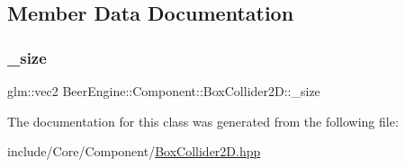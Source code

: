 \subsection{Member Data Documentation}
\mbox{\label{class_beer_engine_1_1_component_1_1_box_collider2_d_ae1472ec7f94fbd4d9cf3854d531f6988}} 
\subsubsection{\texorpdfstring{\+\_\+size}{\_size}}
{\footnotesize\ttfamily glm\+::vec2 Beer\+Engine\+::\+Component\+::\+Box\+Collider2\+D\+::\+\_\+size}



The documentation for this class was generated from the following file\+:\begin{DoxyCompactItemize}
\item 
include/\+Core/\+Component/\mbox{\hyperlink{_box_collider2_d_8hpp}{Box\+Collider2\+D.\+hpp}}\end{DoxyCompactItemize}
